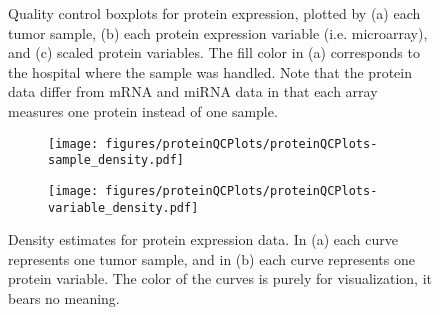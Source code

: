 \begin{figure}
	\centering
	\begin{subfigure}{1\textwidth}
		\centering
	\end{subfigure}
	\begin{subfigure}{1\textwidth}
		\centering
	\end{subfigure}
	\begin{subfigure}{1\textwidth}
		\centering
	\end{subfigure}

	\caption{Quality control boxplots for protein expression, plotted by
	(a) each tumor sample,
	(b) each protein expression variable (i.e. microarray), 
	and (c) scaled protein variables.
	The fill color in (a) corresponds to the hospital where the sample was handled. Note that
	the protein data differ from mRNA and miRNA data in that each array measures one protein instead of one sample.}
	\label{fig:qc-protein-boxplot}
\end{figure}


\begin{figure}[!h]
	\centering
	\begin{subfigure}{.45\textwidth}
		\centering
		\texttt{[image: figures/proteinQCPlots/proteinQCPlots-sample\_density.pdf]}
	\end{subfigure}
	\begin{subfigure}{.45\textwidth}
		\centering
		\texttt{[image: figures/proteinQCPlots/proteinQCPlots-variable\_density.pdf]}
	\end{subfigure}

	\caption{Density estimates for protein expression data. In (a) each curve represents one tumor sample,
	and in (b) each curve represents one protein variable. The color of the curves is purely for visualization,
	it bears no meaning.}
	\label{fig:qc-protein-density}
\end{figure}



